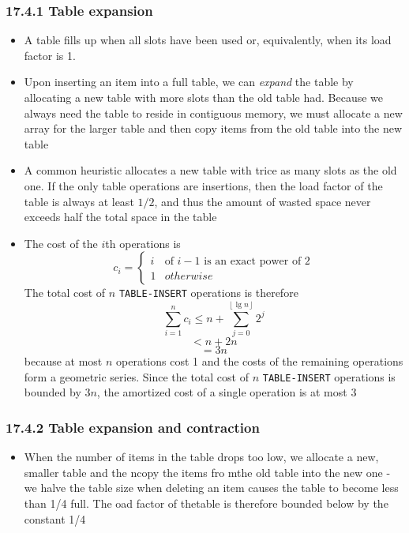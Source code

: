 \documentclass{report}
\begin{document}
\subsubsection{17.4.1 Table expansion}
\begin{itemize}
    \item A table fills up when all slots have been used or, equivalently, when its load factor is 1. 
    \item Upon inserting an item into a full table, we can \textit{expand} the table by allocating a new table with more slots than the old table had. Because we always need the table to reside in contiguous memory, we must allocate a new array for the larger table and then copy items from the old table into the new table
    \item A common heuristic allocates a new table with trice as many slots as the old one. If the only table operations are insertions, then the load factor of the table is always at least $1/2$, and thus the amount of wasted space never exceeds half the total space in the table
    \item The cost of the $i$th operations is
    \[
        c_i =
        \begin{cases}
            i & \text{of $i - 1$ is an exact power of 2} \\
            1 & otherwise
        \end{cases}    
    \]
    The total cost of $n$ \texttt{TABLE-INSERT} operations is therefore
    $$\sum^n _{i = 1} c_i \leq n + \sum^{\left \lfloor{\lg n}\right \rfloor} _{j = 0} 2^j$$
    $$ < n + 2n$$
    $$ = 3n$$
    because at most $n$ operations cost 1 and the costs of the remaining operations form a geometric series. Since the total cost of $n$ \texttt{TABLE-INSERT} operations is bounded by $3n$, the amortized cost of a single operation is at most 3
\end{itemize}
\subsubsection*{17.4.2 Table expansion and contraction}
\begin{itemize}
    \item When the number of items in the table drops too low, we allocate a new, smaller table and the ncopy the items fro mthe old table into the new one - we halve the table size when deleting an item causes the table to become less than 1/4 full. The oad factor of thetable is therefore bounded below by the constant 1/4
\end{itemize}
\end{document}
